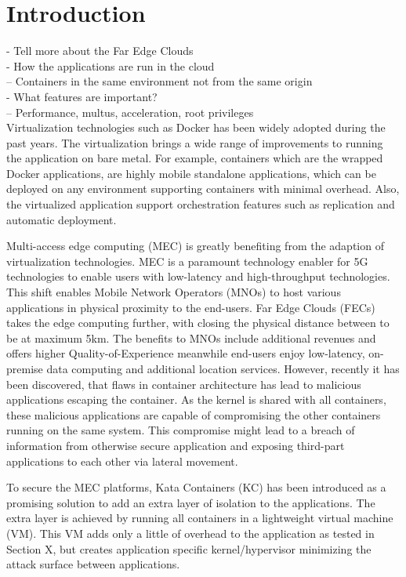 \chapter{Introduction}
\label{chapter:intro}

- Tell more about the Far Edge Clouds \\
- How the applications are run in the cloud \\
-- Containers in the same environment not from the same origin \\
- What features are important? \\
-- Performance, multus, acceleration, root privileges \\


Virtualization technologies such as Docker has been widely adopted during the past years. The virtualization brings a wide range of improvements to running the application on bare metal. For example, containers which are the wrapped Docker applications, are highly mobile standalone applications, which can be deployed on any environment supporting containers with minimal overhead. Also, the virtualized application support orchestration features such as replication and automatic deployment.


Multi-access edge computing (MEC) is greatly benefiting from the adaption of virtualization technologies. MEC is a paramount technology enabler for 5G technologies to enable users with low-latency and high-throughput technologies. This shift enables Mobile Network Operators (MNOs) to host various applications in physical proximity to the end-users. Far Edge Clouds (FECs) takes the edge computing further, with closing the physical distance between to be at maximum 5km. The benefits to MNOs include additional revenues and offers higher Quality-of-Experience meanwhile end-users enjoy low-latency, on-premise data computing and additional location services. However, recently it has been discovered, that flaws in container architecture has lead to malicious applications escaping the container. As the kernel is shared with all containers, these malicious applications are capable of compromising the other containers running on the same system. This compromise might lead to a breach of information from otherwise secure application and exposing third-part applications to each other via lateral movement.

To secure the MEC platforms, Kata Containers (KC) \cite{KataContainers} has been introduced as a promising solution to add an extra layer of isolation to the applications. The extra layer is achieved by running all containers in a lightweight virtual machine (VM). This VM adds only a little of overhead to the application as tested in Section X, but creates application specific kernel/hypervisor minimizing the attack surface between applications.


